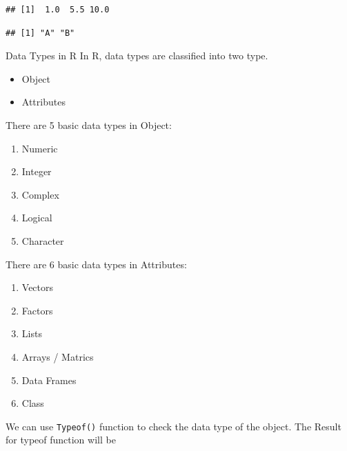 \documentclass[
]{article}
\newenvironment{Shaded}{\begin{snugshade}}{\end{snugshade}}
\newcommand{\AttributeTok}[1]{\textcolor[rgb]{0.13,0.29,0.53}{#1}}
\newcommand{\CommentTok}[1]{\textcolor[rgb]{0.56,0.35,0.01}{\textit{#1}}}
\newcommand{\DecValTok}[1]{\textcolor[rgb]{0.00,0.00,0.81}{#1}}
\newcommand{\FunctionTok}[1]{\textcolor[rgb]{0.13,0.29,0.53}{\textbf{#1}}}
\newcommand{\NormalTok}[1]{#1}
\newcommand{\OtherTok}[1]{\textcolor[rgb]{0.56,0.35,0.01}{#1}}
\newcommand{\SpecialCharTok}[1]{\textcolor[rgb]{0.81,0.36,0.00}{\textbf{#1}}}
\newcommand{\StringTok}[1]{\textcolor[rgb]{0.31,0.60,0.02}{#1}}
\begin{document}
\begin{verbatim}
## [1]  1.0  5.5 10.0
\end{verbatim}

\begin{Shaded}
\end{Shaded}

\begin{verbatim}
## [1] "A" "B"
\end{verbatim}

Data Types in R In R, data types are classified into two type.

\begin{itemize}
\item
  Object
\item
  Attributes
\end{itemize}

There are 5 basic data types in Object:

\begin{enumerate}
\def\labelenumi{\arabic{enumi}.}
\item
  Numeric
\item
  Integer
\item
  Complex
\item
  Logical
\item
  Character
\end{enumerate}

There are 6 basic data types in Attributes:

\begin{enumerate}
\def\labelenumi{\arabic{enumi}.}
\item
  Vectors
\item
  Factors
\item
  Lists
\item
  Arrays / Matrics
\item
  Data Frames
\item
  Class
\end{enumerate}

We can use \texttt{Typeof()} function to check the data type of the
object. The Result for typeof function will be
\end{document}
